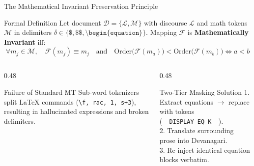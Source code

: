 \documentclass[aspectratio=169,10pt]{beamer}
\begin{document}
\begin{frame}{The Mathematical Invariant Preservation Principle}
  \begin{block}{Formal Definition}
    \footnotesize
    Let document $\mathcal{D} = \{\mathcal{L}, \mathcal{M}\}$ with discourse $\mathcal{L}$ and math tokens $\mathcal{M}$ in delimiters $\delta \in \{\$, \$\$, \texttt{\textbackslash begin\{equation\}}\}$. Mapping $\mathcal{F}$ is \textbf{Mathematically Invariant} iff:
    \[ \forall m_j \in \mathcal{M}, \quad \mathcal{F}(m_j) \equiv m_j \quad \text{and} \quad \text{Order}\big(\mathcal{F}(m_a)\big) < \text{Order}\big(\mathcal{F}(m_b)\big) \iff a < b \]
  \end{block}
  \begin{columns}[T]
    \begin{column}{0.48\textwidth}
      \begin{block}{Failure of Standard MT}
        \footnotesize
        Sub-word tokenizers split LaTeX commands (\texttt{\textbackslash f, rac, 1, s+3}), resulting in hallucinated expressions and broken delimiters.
      \end{block}
    \end{column}
    \begin{column}{0.48\textwidth}
      \begin{block}{Two-Tier Masking Solution}
        \footnotesize
        1. Extract equations $\to$ replace with tokens (\texttt{\_\_DISPLAY\_EQ\_K\_\_}).\\
        2. Translate surrounding prose into Devanagari.\\
        3. Re-inject identical equation blocks verbatim.
      \end{block}
    \end{column}
  \end{columns}
\end{frame}
\end{document}

